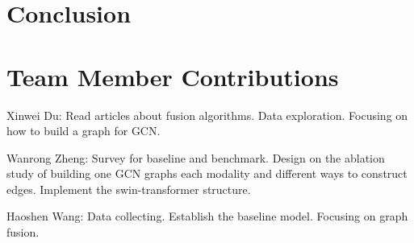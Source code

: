 \documentclass[11pt]{article}
\begin{document}
\section{Conclusion}

\section{Team Member Contributions}

\quad Xinwei Du: Read articles about fusion algorithms. Data exploration. Focusing on how to build a graph for GCN.

Wanrong Zheng: Survey for baseline and benchmark. Design on the ablation study of building one GCN graphs each modality and different ways to construct edges. Implement the swin-transformer structure.

Haoshen Wang: Data collecting. Establish the baseline model. Focusing on graph fusion.



\end{document}
